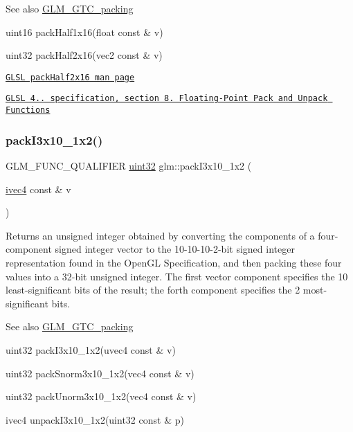 \begin{DoxySeeAlso}{See also}
\hyperlink{group__gtc__packing}{G\+L\+M\+\_\+\+G\+T\+C\+\_\+packing} 

uint16 pack\+Half1x16(float const \& v) 

uint32 pack\+Half2x16(vec2 const \& v) 

\href{http://www.opengl.org/sdk/docs/manglsl/xhtml/packHalf2x16.xml}{\tt G\+L\+SL pack\+Half2x16 man page} 

\href{http://www.opengl.org/registry/doc/GLSLangSpec.4.20.8.pdf}{\tt G\+L\+SL 4.. specification, section 8. Floating-\/\+Point Pack and Unpack Functions} 
\end{DoxySeeAlso}
\mbox{\label{group__gtc__packing_ga032e18fa5bc5b8f3897104aeb2f1e195}} 
\subsubsection{\texorpdfstring{pack\+I3x10\+\_\+1x2()}{packI3x10\_1x2()}}
{\footnotesize\ttfamily G\+L\+M\+\_\+\+F\+U\+N\+C\+\_\+\+Q\+U\+A\+L\+I\+F\+I\+ER \hyperlink{group__gtc__type__precision_ga202b6a53c105fcb7e531f9b443518451}{uint32} glm\+::pack\+I3x10\+\_\+1x2 (\begin{DoxyParamCaption}\item[{\hyperlink{group__core__types_gaa4560ddc50320ea8f8a70d5c9c249fea}{ivec4} const \&}]{v }\end{DoxyParamCaption})}

Returns an unsigned integer obtained by converting the components of a four-\/component signed integer vector to the 10-\/10-\/10-\/2-\/bit signed integer representation found in the Open\+GL Specification, and then packing these four values into a 32-\/bit unsigned integer. The first vector component specifies the 10 least-\/significant bits of the result; the forth component specifies the 2 most-\/significant bits.

\begin{DoxySeeAlso}{See also}
\hyperlink{group__gtc__packing}{G\+L\+M\+\_\+\+G\+T\+C\+\_\+packing} 

uint32 pack\+I3x10\+\_\+1x2(uvec4 const \& v) 

uint32 pack\+Snorm3x10\+\_\+1x2(vec4 const \& v) 

uint32 pack\+Unorm3x10\+\_\+1x2(vec4 const \& v) 

ivec4 unpack\+I3x10\+\_\+1x2(uint32 const \& p) 
\end{DoxySeeAlso}
\mbox{\label{group__gtc__packing_ga1be760860697db386b36513aeafe9d5e}} 

